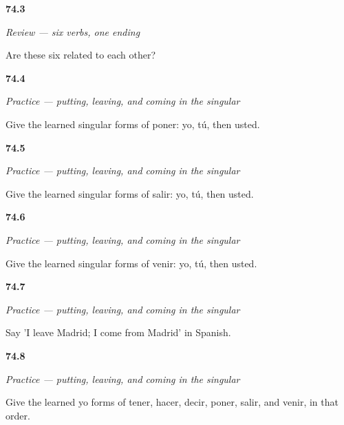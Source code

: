 \noindent\begin{minipage}[t]{\linewidth}
\raggedright
\hypertarget{review-ES-C13-repaso-yo-go-why}{\textbf{74.3}} \emph{Review — six verbs, one ending}\par
\small Are these six related to each other?
\end{minipage}\par\medskip

\noindent\begin{minipage}[t]{\linewidth}
\raggedright
\hypertarget{review-ES-C13-practice-poner-forms}{\textbf{74.4}} \emph{Practice — putting, leaving, and coming in the singular}\par
\small Give the learned singular forms of poner: yo, tú, then usted.
\end{minipage}\par\medskip

\noindent\begin{minipage}[t]{\linewidth}
\raggedright
\hypertarget{review-ES-C13-practice-salir-forms}{\textbf{74.5}} \emph{Practice — putting, leaving, and coming in the singular}\par
\small Give the learned singular forms of salir: yo, tú, then usted.
\end{minipage}\par\medskip

\noindent\begin{minipage}[t]{\linewidth}
\raggedright
\hypertarget{review-ES-C13-practice-venir-forms}{\textbf{74.6}} \emph{Practice — putting, leaving, and coming in the singular}\par
\small Give the learned singular forms of venir: yo, tú, then usted.
\end{minipage}\par\medskip

\noindent\begin{minipage}[t]{\linewidth}
\raggedright
\hypertarget{review-ES-C13-practice-leave-come}{\textbf{74.7}} \emph{Practice — putting, leaving, and coming in the singular}\par
\small Say 'I leave Madrid; I come from Madrid' in Spanish.
\end{minipage}\par\medskip

\noindent\begin{minipage}[t]{\linewidth}
\raggedright
\hypertarget{review-ES-C13-practice-six-yo-forms}{\textbf{74.8}} \emph{Practice — putting, leaving, and coming in the singular}\par
\small Give the learned yo forms of tener, hacer, decir, poner, salir, and venir, in that order.
\end{minipage}\par\medskip

